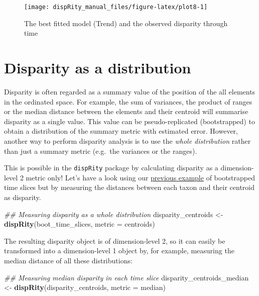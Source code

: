 \documentclass[]{book}
\newenvironment{Shaded}{\begin{snugshade}}{\end{snugshade}}
\newcommand{\CommentTok}[1]{\textcolor[rgb]{0.56,0.35,0.01}{\textit{#1}}}
\newcommand{\DataTypeTok}[1]{\textcolor[rgb]{0.13,0.29,0.53}{#1}}
\newcommand{\KeywordTok}[1]{\textcolor[rgb]{0.13,0.29,0.53}{\textbf{#1}}}
\newcommand{\NormalTok}[1]{#1}
\newcommand{\StringTok}[1]{\textcolor[rgb]{0.31,0.60,0.02}{#1}}
\begin{document}
\begin{figure}

{\centering \texttt{[image: dispRity\_manual\_files/figure-latex/plot8-1]} 

}

\caption{The best fitted model (Trend) and the observed disparity through time}\label{fig:plot8}
\end{figure}

\hypertarget{disparity-as-a-distribution}{%
\section{Disparity as a distribution}\label{disparity-as-a-distribution}}

Disparity is often regarded as a summary value of the position of the all elements in the ordinated space.
For example, the sum of variances, the product of ranges or the median distance between the elements and their centroid will summarise disparity as a single value.
This value can be pseudo-replicated (bootstrapped) to obtain a distribution of the summary metric with estimated error.
However, another way to perform disparity analysis is to use the \emph{whole distribution} rather than just a summary metric (e.g.~the variances or the ranges).

This is possible in the \texttt{dispRity} package by calculating disparity as a dimension-level 2 metric only!
Let's have a look using our \protect\hyperlink{summarising-dispRity-data-plots}{previous example} of bootstrapped time slices but by measuring the distances between each taxon and their centroid as disparity.

\begin{Shaded}
\begin{Highlighting}[]
\CommentTok{## Measuring disparity as a whole distribution}
\NormalTok{disparity_centroids <-}\StringTok{ }\KeywordTok{dispRity}\NormalTok{(boot_time_slices, }
                                \DataTypeTok{metric =}\NormalTok{ centroids)}
\end{Highlighting}
\end{Shaded}

The resulting disparity object is of dimension-level 2, so it can easily be transformed into a dimension-level 1 object by, for example, measuring the median distance of all these distributions:

\begin{Shaded}
\begin{Highlighting}[]
\CommentTok{## Measuring median disparity in each time slice}
\NormalTok{disparity_centroids_median <-}\StringTok{ }\KeywordTok{dispRity}\NormalTok{(disparity_centroids,}
                                       \DataTypeTok{metric =}\NormalTok{ median)}
\end{Highlighting}
\end{Shaded}
\end{document}
